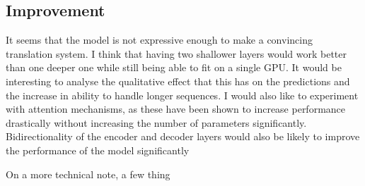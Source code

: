 \documentclass[]{article}
\begin{document}
\subsection{Improvement}
It seems that the model is not expressive enough to make a convincing translation system. I think that having two shallower layers would work better than one deeper one while still being able to fit on a single GPU. It would be interesting to analyse the qualitative effect that this has on the predictions and the increase in ability to handle longer sequences. I would also like to experiment with attention mechanisms, as these have been shown to increase performance drastically without increasing the number of parameters significantly. Bidirectionality of the encoder and decoder layers would also be likely to improve the performance of the model significantly

On a more technical note, a few thing
\end{document}
